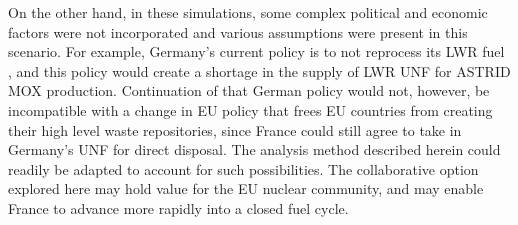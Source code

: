 On the other hand, in these simulations, some complex political and economic
factors were not incorporated and various assumptions were present in this scenario. For
example, Germany's current policy is to not reprocess its \gls{LWR} fuel
\cite{topfer_germanys_2011}, and this policy would create a shortage
in the supply of \gls{LWR} \gls{UNF} for \gls{ASTRID} \gls{MOX} production.
Continuation of that German policy would not, however, be incompatible
with a change in \gls{EU} policy that frees \gls{EU} countries from
creating their high level waste repositories, since France could still
agree to take in Germany's \gls{UNF} for direct disposal. The analysis
method described herein could readily be adapted to account for such possibilities. 
The collaborative option explored here may hold value for the \gls{EU} nuclear community,
and may enable France to advance more rapidly into a closed fuel cycle. 
\FloatBarrier

\FloatBarrier
